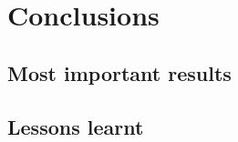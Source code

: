 \documentclass[11pt]{book} %
\begin{document}
\chapter{Conclusions}
  \label{sec:conclusions}

  \section{Most important results}

  \section{Lessons learnt}



\newpage


\nocite{*}
\newpage
\printbibliography
\end{document}
